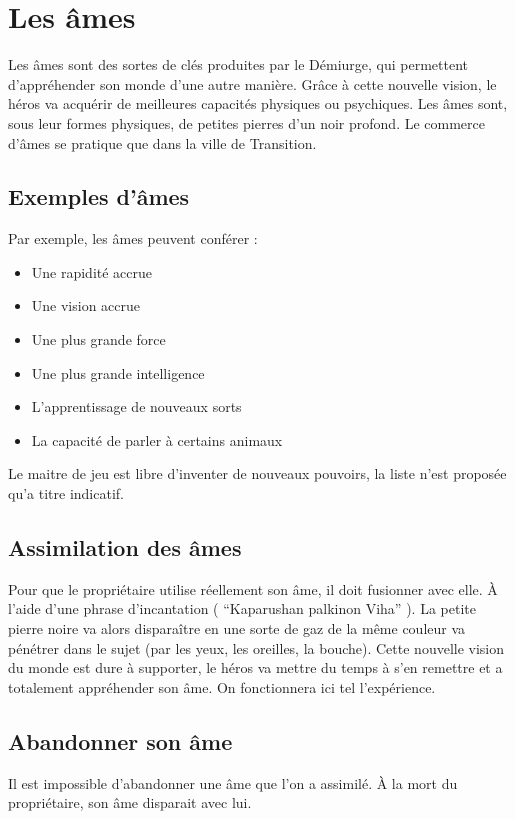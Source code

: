 
\section{Les âmes}
Les âmes sont des sortes de clés produites par le Démiurge, qui permettent d'appréhender son monde d'une autre manière. Grâce à cette nouvelle vision, le héros va acquérir de meilleures capacités physiques ou psychiques. Les âmes sont, sous leur formes physiques, de petites pierres d'un noir profond. Le commerce d'âmes se pratique que dans la ville de Transition.
\subsection{Exemples d’âmes}
Par exemple, les âmes peuvent conférer :
\begin{itemize}
\item Une rapidité accrue
\item Une vision accrue
\item Une plus grande force
\item Une plus grande intelligence
\item L'apprentissage de nouveaux sorts
\item La capacité de parler à certains animaux
\end{itemize}
Le maitre de jeu est libre d'inventer de nouveaux pouvoirs, la liste n'est proposée qu'a titre indicatif.
\subsection{Assimilation des âmes}
Pour que le propriétaire utilise réellement son âme, il doit fusionner avec elle. À l'aide d'une phrase d'incantation ( “Kaparushan palkinon Viha” ). La petite pierre noire va alors disparaître en une sorte de gaz de la même couleur va pénétrer dans le sujet (par les yeux, les oreilles, la bouche). Cette nouvelle vision du monde est dure à supporter, le héros va mettre du temps à s'en remettre et a totalement appréhender son âme. On fonctionnera ici tel l’expérience.
\subsection{Abandonner son âme}
Il est impossible d'abandonner une âme que l'on a assimilé. À la mort du propriétaire, son âme disparait avec lui.